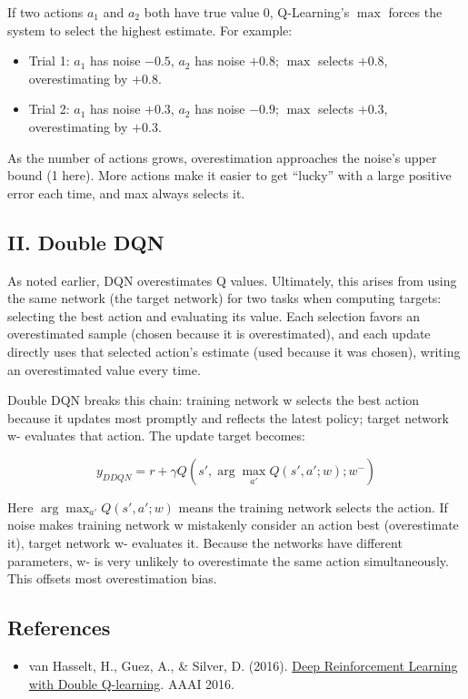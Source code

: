 If two actions \(a_1\) and \(a_2\) both have true value \(0\), Q-Learning's \(\max\) forces the system to select the highest estimate. For example:

\begin{itemize}
\tightlist
\item
  Trial 1: \(a_1\) has noise \(-0.5\), \(a_2\) has noise \(+0.8\); \(\max\) selects \(+0.8\), overestimating by \(+0.8\).
\item
  Trial 2: \(a_1\) has noise \(+0.3\), \(a_2\) has noise \(-0.9\); \(\max\) selects \(+0.3\), overestimating by \(+0.3\).
\end{itemize}

As the number of actions grows, overestimation approaches the noise's upper bound (1 here). More actions make it easier to get ``lucky'' with a large positive error each time, and max always selects it.

\hypertarget{ii.-double-dqn}{%
\subsection{II. Double DQN}\label{ii.-double-dqn}}

As noted earlier, DQN overestimates Q values. Ultimately, this arises from using the same network (the target network) for two tasks when computing targets: selecting the best action and evaluating its value. Each selection favors an overestimated sample (chosen because it is overestimated), and each update directly uses that selected action's estimate (used because it was chosen), writing an overestimated value every time.

Double DQN breaks this chain: training network w selects the best action because it updates most promptly and reflects the latest policy; target network w- evaluates that action. The update target becomes:

\[
y_{DDQN}=r+\gamma Q(s',\arg\max_{a'}Q(s',a';w);w^{-})
\]

Here \(\arg\max_{a'}Q(s',a';w)\) means the training network selects the action.
If noise makes training network w mistakenly consider an action best (overestimate it), target network w- evaluates it. Because the networks have different parameters, w- is very unlikely to overestimate the same action simultaneously. This offsets most overestimation bias.

\FloatBarrier
{}
\hypertarget{references-51}{%
\subsection{References}\label{references-51}}

\vspace{0.25em}
\begin{itemize}
\tightlist
\item
  van Hasselt, H., Guez, A., \& Silver, D. (2016). \href{https://arxiv.org/abs/1509.06461}{Deep Reinforcement Learning with Double Q-learning}. AAAI 2016.
\end{itemize}

\clearpage
